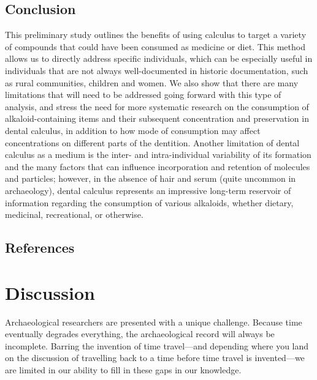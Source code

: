 \documentclass[
  letterpaper,
]{book}
\begin{document}
\hypertarget{conclusion-1}{%
\section{Conclusion}\label{conclusion-1}}

This preliminary study outlines the benefits of using calculus to target
a variety of compounds that could have been consumed as medicine or
diet. This method allows us to directly address specific individuals,
which can be especially useful in individuals that are not always
well-documented in historic documentation, such as rural communities,
children and women. We also show that there are many limitations that
will need to be addressed going forward with this type of analysis, and
stress the need for more systematic research on the consumption of
alkaloid-containing items and their subsequent concentration and
preservation in dental calculus, in addition to how mode of consumption
may affect concentrations on different parts of the dentition. Another
limitation of dental calculus as a medium is the inter- and
intra-individual variability of its formation and the many factors that
can influence incorporation and retention of molecules and particles;
however, in the absence of hair and serum (quite uncommon in
archaeology), dental calculus represents an impressive long-term
reservoir of information regarding the consumption of various alkaloids,
whether dietary, medicinal, recreational, or otherwise.

\hypertarget{references-1}{%
\section*{References}\label{references-1}}



\hypertarget{chap-discussion}{%
\chapter{Discussion}\label{chap-discussion}}

Archaeological researchers are presented with a unique challenge.
Because time eventually degrades everything, the archaeological record
will always be incomplete. Barring the invention of time travel---and
depending where you land on the discussion of travelling back to a time
before time travel is invented---we are limited in our ability to fill
in these gaps in our knowledge.
\end{document}
